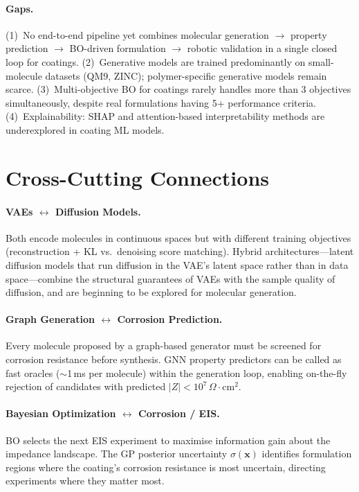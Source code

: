 \documentclass[11pt,a4paper]{article}
\begin{document}
\paragraph{Gaps.}
(1)~No end-to-end pipeline yet combines molecular generation $\to$ property prediction $\to$ BO-driven formulation $\to$ robotic validation in a single closed loop for coatings.
(2)~Generative models are trained predominantly on small-molecule datasets (QM9, ZINC); polymer-specific generative models remain scarce.
(3)~Multi-objective BO for coatings rarely handles more than 3 objectives simultaneously, despite real formulations having 5+ performance criteria.
(4)~Explainability: SHAP and attention-based interpretability methods are underexplored in coating ML models.

\section{Cross-Cutting Connections}
\label{sec:crosscut}

\paragraph{VAEs $\leftrightarrow$ Diffusion Models.}
Both encode molecules in continuous spaces but with different training objectives (reconstruction + KL vs.\ denoising score matching).
Hybrid architectures---latent diffusion models that run diffusion in the VAE's latent space rather than in data space---combine the structural guarantees of VAEs with the sample quality of diffusion, and are beginning to be explored for molecular generation.

\paragraph{Graph Generation $\leftrightarrow$ Corrosion Prediction.}
Every molecule proposed by a graph-based generator must be screened for corrosion resistance before synthesis.
GNN property predictors can be called as fast oracles ($\sim$1\,ms per molecule) within the generation loop, enabling on-the-fly rejection of candidates with predicted $|Z| < 10^7\,\Omega\cdot\text{cm}^2$.

\paragraph{Bayesian Optimization $\leftrightarrow$ Corrosion / EIS.}
BO selects the next EIS experiment to maximise information gain about the impedance landscape.
The GP posterior uncertainty $\sigma(\mathbf{x})$ identifies formulation regions where the coating's corrosion resistance is most uncertain, directing experiments where they matter most.
\end{document}
